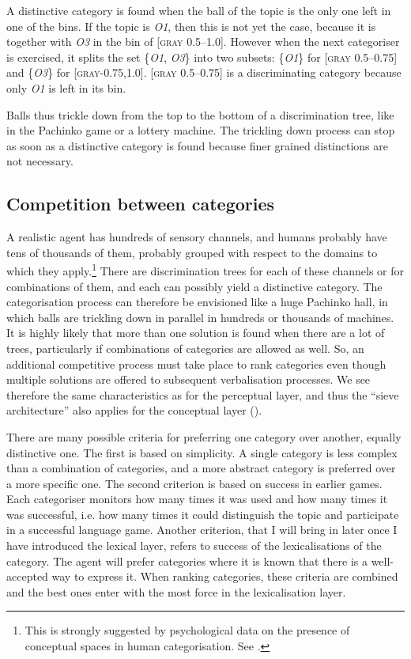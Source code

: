 A distinctive category is found when the ball of the 
topic is the only one left in one of the bins. 
If the topic is \emph{O1}, then this is not yet the 
case, because it is together with \emph{O3} in the 
bin of [\textsc{gray} 0.5–1.0]. However when the next categoriser
is exercised, it splits the set \{\emph{O1}, \emph{O3}\} 
into two subsets: \{\emph{O1}\} for [\textsc{gray} 0.5–0.75]
and \{\emph{O3}\} for [\textsc{gray}-0.75,1.0]. 
[\textsc{gray} 0.5–0.75] is a discriminating category because only 
\emph{O1} is left in its bin. 

Balls thus trickle down from the top to the bottom of \enlargethispage{1\baselineskip}
a discrimination tree, like in the Pachinko game or 
a lottery machine. The trickling down process can stop as
soon as a distinctive category is found because finer grained 
distinctions are not necessary. 

\subsection{Competition between categories}

A realistic agent has hundreds of sensory
channels, and humans probably have tens of thousands
of them, probably grouped with respect to the domains
to which they apply.\footnote{
This is strongly suggested by psychological 
data on the presence of conceptual spaces in human 
categorisation. See \cite{Gardenfors:1999}.} There are discrimination trees
for each of 
these channels or for combinations of them, and 
each can possibly yield a distinctive
category. The categorisation process can therefore be
envisioned like a huge Pachinko hall, in which
balls are trickling down in parallel in hundreds or 
thousands of machines. It is highly 
likely that more than one solution is found
when there are a lot of trees, particularly 
if combinations of categories are allowed as well. 
So, an additional competitive process must 
take place to rank categories even 
though multiple solutions are offered to subsequent
verbalisation processes. We see therefore the same
characteristics as for the perceptual layer, and thus
the ``sieve architecture'' also 
applies for the conceptual layer (). 
 
There are many possible criteria for preferring 
one category over another, equally distinctive one. 
The first is based on 
simplicity. A single category is less complex than 
a combination of categories, and a more abstract category 
is preferred over a more specific one. 
The second criterion is based on success in earlier games. 
Each categoriser monitors how many
times it was used and how many times
it was successful, i.e. how many times it could distinguish
the topic and participate in a successful language game. 
Another criterion, that I will bring in later 
once I have introduced the lexical layer, refers to 
success of the lexicalisations of the category. The agent 
will prefer categories where it is known that there is
a well-accepted way to express it. 
When ranking categories, these criteria are combined
and the best ones enter with the most force in the 
lexicalisation layer. 

